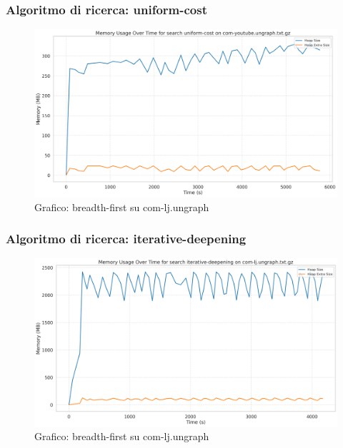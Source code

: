 \documentclass{article}
\begin{document}
\subsubsection{Algoritmo di ricerca: uniform-cost}
\begin{figure}[h]\centering
\includegraphics[width=\textwidth]{../plots/com-youtube.ungraph_uniform-cost.png}
\caption{Grafico: breadth-first su com-lj.ungraph}
\end{figure}
\subsubsection{Algoritmo di ricerca: iterative-deepening}
\begin{figure}[h]\centering
\includegraphics[width=\textwidth]{../plots/com-lj.ungraph_iterative-deepening.png}
\caption{Grafico: breadth-first su com-lj.ungraph}
\end{figure}
\end{document}
